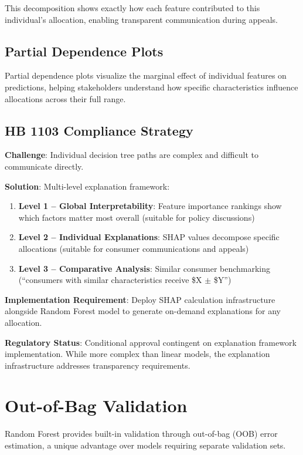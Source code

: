 This decomposition shows exactly how each feature contributed to this individual's allocation, enabling transparent communication during appeals.

\subsection{Partial Dependence Plots}

Partial dependence plots visualize the marginal effect of individual features on predictions, helping stakeholders understand how specific characteristics influence allocations across their full range.

\subsection{HB 1103 Compliance Strategy}

\textbf{Challenge}: Individual decision tree paths are complex and difficult to communicate directly.

\textbf{Solution}: Multi-level explanation framework:

\begin{enumerate}
    \item \textbf{Level 1 -- Global Interpretability}: Feature importance rankings show which factors matter most overall (suitable for policy discussions)
    \item \textbf{Level 2 -- Individual Explanations}: SHAP values decompose specific allocations (suitable for consumer communications and appeals)
    \item \textbf{Level 3 -- Comparative Analysis}: Similar consumer benchmarking (``consumers with similar characteristics receive \$X $\pm$ \$Y'')
\end{enumerate}

\textbf{Implementation Requirement}: Deploy SHAP calculation infrastructure alongside Random Forest model to generate on-demand explanations for any allocation.

\textbf{Regulatory Status}: Conditional approval contingent on explanation framework implementation. While more complex than linear models, the explanation infrastructure addresses transparency requirements.

\section{Out-of-Bag Validation}

Random Forest provides built-in validation through out-of-bag (OOB) error estimation, a unique advantage over models requiring separate validation sets.


